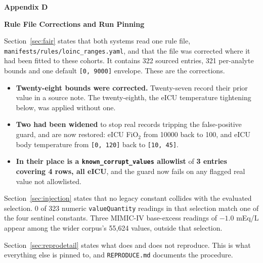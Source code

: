 \FloatBarrier
\newpage
{}
{}
{\centering\normalfont\bfseries\large Appendix D\par}
{\centering\normalfont\bfseries\large Rule File Corrections and Run Pinning\par}
\nopagebreak

Section~\ref{sec:fair} states that both systems read one rule file,
\texttt{manifests/rules/loinc\_ranges.yaml}, and that the file was corrected where it had been fitted
to these cohorts. It contains 322 sourced entries, 321 per-analyte bounds and one default
\texttt{[0, 9000]} envelope. These are the corrections.

\begin{itemize}[leftmargin=1.4em, itemsep=0.15em]
  \item \textbf{Twenty-eight bounds were corrected.} Twenty-seven record their prior value in a
        source note. The twenty-eighth, the eICU temperature tightening below, was applied without
        one.
  \item \textbf{Two had been widened} to stop real records tripping the false-positive guard, and are
        now restored: eICU FiO$_2$ from 10000 back to 100, and eICU body temperature from
        \texttt{[0, 120]} back to \texttt{[10, 45]}.
  \item \textbf{In their place is a \texttt{known\_corrupt\_values} allowlist} of \textbf{3 entries
        covering 4 rows, all eICU}, and the guard now fails on any flagged real value not
        allowlisted.
\end{itemize}

Section~\ref{sec:injection} states that no legacy constant collides with the evaluated selection.
0 of 323 numeric \texttt{valueQuantity} readings in that selection match one of the four sentinel
constants. Three MIMIC-IV base-excess readings of $-1.0$ mEq/L appear among the wider
corpus's 55{,}624 values, outside that selection.

Section~\ref{sec:reprodetail} states what does and does not reproduce. This is what everything else
is pinned to, and \texttt{REPRODUCE.md} documents the procedure.

